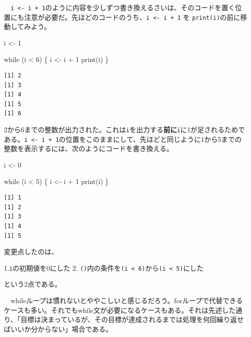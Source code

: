 \documentclass[
  a4paper,
  pandoc,
  ja=standard,
  jafont=haranoaji]{bxjsbook}
\newenvironment{Shaded}{\begin{snugshade}}{\end{snugshade}}
\newcommand{\ControlFlowTok}[1]{\textcolor[rgb]{0.00,0.48,0.65}{#1}}
\newcommand{\DecValTok}[1]{\textcolor[rgb]{0.68,0.00,0.00}{#1}}
\newcommand{\FunctionTok}[1]{\textcolor[rgb]{0.28,0.35,0.67}{#1}}
\newcommand{\NormalTok}[1]{\textcolor[rgb]{0.00,0.48,0.65}{#1}}
\newcommand{\OtherTok}[1]{\textcolor[rgb]{0.00,0.48,0.65}{#1}}
\newcommand{\SpecialCharTok}[1]{\textcolor[rgb]{0.37,0.37,0.37}{#1}}
\begin{document}
　\texttt{i\ \textless{}-\ i\ +\ 1}のように内容を少しずつ書き換えるさいは、そのコードを置く位置にも注意が必要だ。先ほどのコードのうち、\texttt{i\ \textless{}-\ i\ +\ 1}
を \texttt{print(i)}の前に移動してみよう。

\begin{Shaded}
\begin{Highlighting}[numbers=left,,]
\NormalTok{i }\OtherTok{\textless{}{-}} \DecValTok{1}

\ControlFlowTok{while}\NormalTok{ (i }\SpecialCharTok{\textless{}} \DecValTok{6}\NormalTok{) \{}
\NormalTok{  i }\OtherTok{\textless{}{-}}\NormalTok{ i }\SpecialCharTok{+} \DecValTok{1}
  \FunctionTok{print}\NormalTok{(i)}
\NormalTok{\}}
\end{Highlighting}
\end{Shaded}

\begin{verbatim}
[1] 2
[1] 3
[1] 4
[1] 5
[1] 6
\end{verbatim}

2から6までの整数が出力された。これは\texttt{i}を出力する\textbf{前に}\texttt{i}に1が足されるためである。\texttt{i\ \textless{}-\ i\ +\ 1}の位置をこのままにして、先ほどと同じように1から5までの整数を表示するには、次のようにコードを書き換える。

\begin{Shaded}
\begin{Highlighting}[numbers=left,,]
\NormalTok{i }\OtherTok{\textless{}{-}} \DecValTok{0}

\ControlFlowTok{while}\NormalTok{ (i }\SpecialCharTok{\textless{}} \DecValTok{5}\NormalTok{) \{}
\NormalTok{  i }\OtherTok{\textless{}{-}}\NormalTok{ i }\SpecialCharTok{+} \DecValTok{1}
  \FunctionTok{print}\NormalTok{(i)}
\NormalTok{\}}
\end{Highlighting}
\end{Shaded}

\begin{verbatim}
[1] 1
[1] 2
[1] 3
[1] 4
[1] 5
\end{verbatim}

変更点したのは、

1.\texttt{i}の初期値を0にした 2.
\texttt{()}内の条件を\texttt{(i\ \textless{}\ 6)}から\texttt{(i\ \textless{}\ 5)}にした

という2点である。

　whileループは慣れないとややこしいと感じるだろう。forループで代替できるケースも多い。それでもwhile文が必要になるケースもある。それは先述した通り、「目標は決まっているが、その目標が達成されるまでは処理を何回繰り返せばいいか分からない」場合である。
\end{document}
